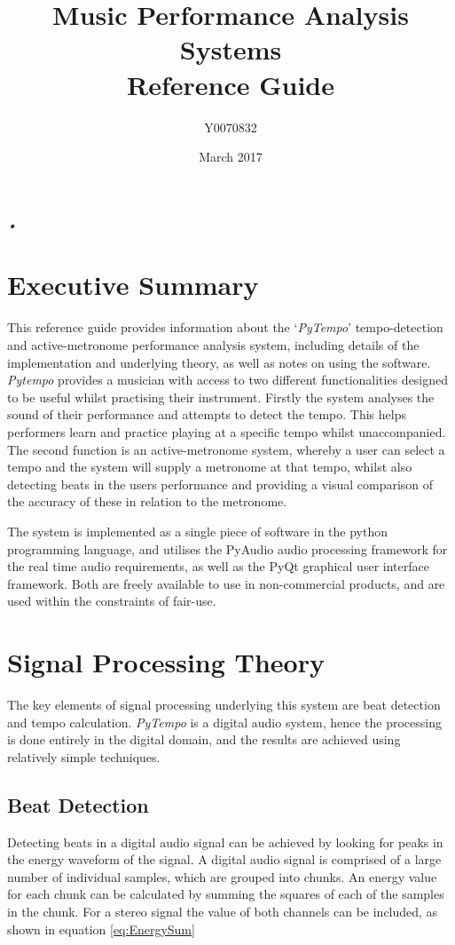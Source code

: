 \documentclass[hidelinks,12pt]{article}
\date{March 2017}
\title{Music Performance Analysis Systems\\\large{Reference Guide}}
\author{Y0070832}
\begin{document}
\maketitle
\tableofcontents
\newpage\textsl{•}
\section{Executive Summary}
This reference guide provides information about the `\textit{PyTempo}' tempo-detection and active-metronome performance analysis system, including details of the implementation and underlying theory, as well as notes on using the software. \textit{Pytempo} provides a musician with access to two different functionalities designed to be useful whilst practising their instrument. Firstly the system analyses the sound of their performance and attempts to detect the tempo. This helps performers learn and practice playing at a specific tempo whilst unaccompanied. The second function is an active-metronome system, whereby a user can select a tempo and the system will supply a metronome at that tempo, whilst also detecting beats in the users performance and providing a visual comparison of the accuracy of these in relation to the metronome.

The system is implemented as a single piece of software in the python programming language, and utilises the PyAudio audio processing framework for the real time audio requirements, as well as the PyQt graphical user interface framework. Both are freely available to use in non-commercial products, and are used within the constraints of fair-use.
\section{Signal Processing Theory} \label{Processing}
The key elements of signal processing underlying this system are beat detection and tempo calculation. \textit{PyTempo} is a digital audio system, hence the processing is done entirely in the digital domain, and the results are achieved using relatively simple techniques.
\subsection{Beat Detection} \label{BeatDetection}
Detecting beats in a digital audio signal can be achieved by looking for peaks in the energy waveform of the signal. A digital audio signal is comprised of a large number of individual samples, which are grouped into chunks. An energy value for each chunk can be calculated by summing the squares of each of the samples in the chunk. For a stereo signal the value of both channels can be included, as shown in equation \ref{eq:EnergySum}
\end{document}
